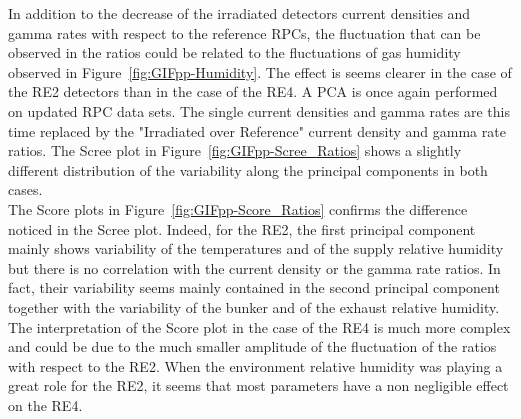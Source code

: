 	In addition to the decrease of the irradiated detectors current densities and gamma rates with respect to the reference RPCs, the fluctuation that can be observed in the ratios could be related to the fluctuations of gas humidity observed in Figure~\ref{fig:GIFpp-Humidity}. The effect is seems clearer in the case of the RE2 detectors than in the case of the RE4. A PCA is once again performed on updated RPC data sets. The single current densities and gamma rates are this time replaced by the "Irradiated over Reference" current density and gamma rate ratios. The Scree plot in Figure~\ref{fig:GIFpp-Scree_Ratios} shows a slightly different distribution of the variability along the principal components in both cases.\\
	The Score plots in Figure~\ref{fig:GIFpp-Score_Ratios} confirms the difference noticed in the Scree plot. Indeed, for the RE2, the first principal component mainly shows variability of the temperatures and of the supply relative humidity but there is no correlation with the current density or the gamma rate ratios. In fact, their variability seems mainly contained in the second principal component together with the variability of the bunker and of the exhaust relative humidity. The interpretation of the Score plot in the case of the RE4 is much more complex and could be due to the much smaller amplitude of the fluctuation of the ratios with respect to the RE2. When the environment relative humidity was playing a great role for the RE2, it seems that most parameters have a non negligible effect on the RE4.\\
	
\begingroup\setlength{\intextsep}{0pt}\setlength{\columnsep}{15pt}

